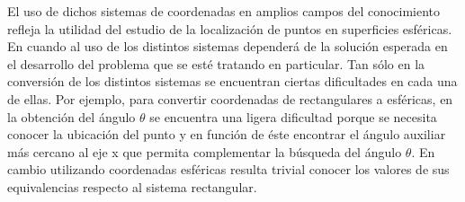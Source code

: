\hspace{4mm} El uso de dichos sistemas de coordenadas en amplios campos del conocimiento refleja la utilidad del estudio de la localización de puntos en superficies esféricas. En cuando al uso de los distintos sistemas dependerá de la solución esperada en el desarrollo del problema que se esté tratando en particular. Tan sólo en la conversión de los distintos sistemas se encuentran ciertas dificultades en cada una de ellas. Por ejemplo, para convertir coordenadas de rectangulares a esféricas, en la obtención del ángulo ${\theta}$ se encuentra una ligera dificultad porque se necesita conocer la ubicación del punto y en función de éste encontrar el ángulo auxiliar más cercano al eje x que permita complementar la búsqueda del ángulo ${\theta}$. En cambio utilizando coordenadas esféricas resulta trivial conocer los valores de sus equivalencias respecto al sistema rectangular. \cite{ecured}